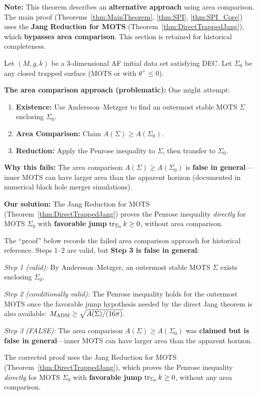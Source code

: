 \begin{theorem}
\label{thm:DefinitiveAreaMonotonicity}\label{thm:AreaMonotonicity}
\textbf{Note:} This theorem describes an \textbf{alternative approach} using area comparison. The main proof (Theorems~\ref{thm:MainTheorem}, \ref{thm:SPI}, \ref{thm:SPI_Core}) uses the \textbf{Jang Reduction for MOTS} (Theorem~\ref{thm:DirectTrappedJang}), which \textbf{bypasses area comparison}. This section is retained for historical completeness.

Let $(M,g,k)$ be a 3-dimensional AF initial data set satisfying DEC. Let $\Sigma_0$ be any closed trapped surface (MOTS or with $\theta^+ \le 0$).

\textbf{The area comparison approach (problematic):} One might attempt:
\begin{enumerate}
    \item \textbf{Existence:} Use Andersson--Metzger to find an outermost stable MOTS $\Sigma$ enclosing $\Sigma_0$.
    \item \textbf{Area Comparison:} Claim $A(\Sigma) \ge A(\Sigma_0)$.
    \item \textbf{Reduction:} Apply the Penrose inequality to $\Sigma$, then transfer to $\Sigma_0$.
\end{enumerate}

\textbf{Why this fails:} The area comparison $A(\Sigma) \ge A(\Sigma_0)$ is \textbf{false in general}---inner MOTS can have larger area than the apparent horizon (documented in numerical black hole merger simulations).

\textbf{Our solution:} The Jang Reduction for MOTS (Theorem~\ref{thm:DirectTrappedJang}) proves the Penrose inequality \emph{directly} for MOTS $\Sigma_0$ with \textbf{favorable jump} $\operatorname{tr}_{\Sigma_0} k \ge 0$, without area comparison.
\end{theorem}

\begin{remark}
The ``proof'' below records the failed area comparison approach for historical reference. Steps 1--2 are valid, but \textbf{Step 3 is false in general}:

\textit{Step 1 (valid):} By Andersson--Metzger, an outermost stable MOTS $\Sigma$ exists enclosing $\Sigma_0$.

\textit{Step 2 (conditionally valid):} The Penrose inequality holds for the outermost MOTS once the favorable jump hypothesis needed by the direct Jang theorem is also available: $M_{\mathrm{ADM}} \ge \sqrt{A(\Sigma)/(16\pi)}$.

\textit{Step 3 (FALSE):} The area comparison $A(\Sigma) \ge A(\Sigma_0)$ was \textbf{claimed but is false in general}---inner MOTS can have larger area than the apparent horizon.

The corrected proof uses the Jang Reduction for MOTS (Theorem~\ref{thm:DirectTrappedJang}), which proves the Penrose inequality \emph{directly} for MOTS $\Sigma_0$ with \textbf{favorable jump} $\operatorname{tr}_{\Sigma_0} k \ge 0$, without any area comparison.
\end{remark}

